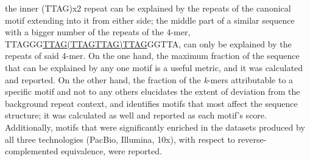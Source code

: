 \documentclass{article}
\begin{document}
            the inner (TTAG)x2 repeat can be explained by the repeats of the canonical motif extending into it from either side;
            the middle part of a similar sequence with a bigger number of the repeats of the 4-mer, TTAGGG\underline{TTAG(TTAGTTAG)TTAG}GGTTA,
                can only be explained by the repeats of said 4-mer.
        On the one hand, the maximum fraction of the sequence that can be explained by any one motif is a useful metric,
            and it was calculated and reported.
        On the other hand, the fraction of the \textit{k}-mers attributable to a specific motif \textendash{} and not to any others \textendash{}
            elucidates the extent of deviation from the background repeat context,
            and identifies motifs that most affect the sequence structure;
            it was calculated as well and reported as each motif's score.
    Additionally, motifs that were significantly enriched in the datasets produced by all three technologies (PacBio, Illumina, 10x),
        with respect to reverse-complemented equivalence, were reported.
\end{document}
